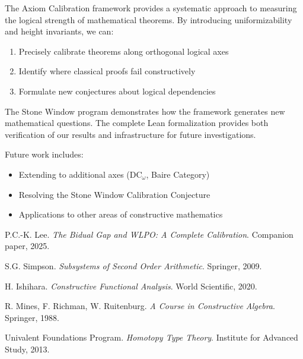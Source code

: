 \documentclass[11pt]{article}
\begin{document}
The Axiom Calibration framework provides a systematic approach to measuring the logical strength of mathematical theorems. By introducing uniformizability and height invariants, we can:

\begin{enumerate}
\item Precisely calibrate theorems along orthogonal logical axes
\item Identify where classical proofs fail constructively
\item Formulate new conjectures about logical dependencies
\end{enumerate}

The Stone Window program demonstrates how the framework generates new mathematical questions. The complete Lean formalization provides both verification of our results and infrastructure for future investigations.

Future work includes:
\begin{itemize}
\item Extending to additional axes (DC$_\omega$, Baire Category)
\item Resolving the Stone Window Calibration Conjecture
\item Applications to other areas of constructive mathematics
\end{itemize}

\begin{thebibliography}{10}
 P.C.-K. Lee. \emph{The Bidual Gap and WLPO: A Complete Calibration}. Companion paper, 2025.

 S.G. Simpson. \emph{Subsystems of Second Order Arithmetic}. Springer, 2009.

 H. Ishihara. \emph{Constructive Functional Analysis}. World Scientific, 2020.

 R. Mines, F. Richman, W. Ruitenburg. \emph{A Course in Constructive Algebra}. Springer, 1988.

 Univalent Foundations Program. \emph{Homotopy Type Theory}. Institute for Advanced Study, 2013.
\end{thebibliography}
\end{document}
